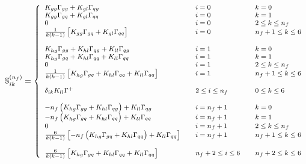 \documentclass[10pt,a4paper]{article}
\begin{document}
\begin{equation}
\footnotesize
\mathbb{S}_{ik}^{(n_f)} =
\left\{
\begin{array}{lll}
K_{gg}\Gamma_{gg}+K_{gl}\Gamma_{qg} &
                                                                      \quad i = 0 &\quad k = 0\\
K_{gg}\Gamma_{gq}+K_{gl}\Gamma_{qq} & \quad i = 0 &\quad k =1\\
0 & \quad i = 0 &\quad  2\leq k \leq n_f\\
\frac1{k(k-1)}\left[K_{gg}\Gamma_{gq}+K_{gl}\Gamma_{qq}\right] & \quad i = 0 &\quad  n_f+ 1\leq k \leq 6\\
\\
K_{hg}\Gamma_{gg}+K_{hl}\Gamma_{qg}+K_{ll}\Gamma_{qg} & \quad i = 1&\quad  k=0\\
K_{hg}\Gamma_{gq}+K_{hl}\Gamma_{qq}+K_{ll}\Gamma_{qq}& \quad i = 1 &\quad  k=1\\
0 & \quad i = 1 &\quad  2\leq k \leq n_f\\
\frac{1}{k(k-1)}\left[K_{hg}\Gamma_{gq}+K_{hl}\Gamma_{qq}+K_{ll}\Gamma_{qq}\right] & \quad i = 1 &\quad  n_f+1\leq k\leq 6\\
\\
\delta_{ik}K_{ll}\Gamma^+&\quad 2\leq i \leq n_f &\quad 0\leq k
                                                         \leq 6\\
\\
-n_f \left(K_{hg}\Gamma_{gg}+K_{hl}\Gamma_{qg}\right)+K_{ll}\Gamma_{qg}&\quad i = n_f+1 &\quad k =0\\
-n_f \left(K_{hg}\Gamma_{gq}+K_{hl}\Gamma_{qq}\right)+K_{ll}\Gamma_{qq}&\quad i = n_f+1 &\quad k =1\\
0 & \quad i = n_f+1 &\quad  2\leq k \leq n_f\\
  \frac{6}{k(k-1)}\left[-n_f \left(K_{hg}\Gamma_{gq}+K_{hl}\Gamma_{qq}\right)+K_{ll}\Gamma_{qq}\right]
&\quad i = n_f+1 &\quad n_f+1 \leq k \leq 6\\
\\
  \frac{6}{k(k-1)}\left[K_{hg}\Gamma_{gq}+K_{hl}\Gamma_{qq}+K_{ll}\Gamma_{qq} \right]
& \quad n_f+2\leq i \leq 6 &\quad  n_f+
                                                            2\leq k
                                                            \leq 6\\
\end{array}
\right.
\end{equation}
\end{document}
